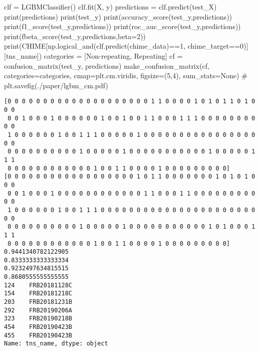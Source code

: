 \documentclass[
  letterpaper,
  DIV=11,
  numbers=noendperiod]{scrartcl}
\newenvironment{Shaded}{\begin{snugshade}}{\end{snugshade}}
\newcommand{\BuiltInTok}[1]{\textcolor[rgb]{0.00,0.23,0.31}{#1}}
\newcommand{\CommentTok}[1]{\textcolor[rgb]{0.37,0.37,0.37}{#1}}
\newcommand{\DecValTok}[1]{\textcolor[rgb]{0.68,0.00,0.00}{#1}}
\newcommand{\NormalTok}[1]{\textcolor[rgb]{0.00,0.23,0.31}{#1}}
\newcommand{\OperatorTok}[1]{\textcolor[rgb]{0.37,0.37,0.37}{#1}}
\newcommand{\StringTok}[1]{\textcolor[rgb]{0.13,0.47,0.30}{#1}}
\newcommand{\VariableTok}[1]{\textcolor[rgb]{0.07,0.07,0.07}{#1}}
\begin{document}
\begin{Shaded}
\begin{Highlighting}[]
\NormalTok{clf }\OperatorTok{=}\NormalTok{ LGBMClassifier()}
\NormalTok{clf.fit(X, y)}
\NormalTok{predictions }\OperatorTok{=}\NormalTok{ clf.predict(test\_X)}
\BuiltInTok{print}\NormalTok{(predictions)}
\BuiltInTok{print}\NormalTok{(test\_y)}
\BuiltInTok{print}\NormalTok{(accuracy\_score(test\_y,predictions))}
\BuiltInTok{print}\NormalTok{(f1\_score(test\_y,predictions))}
\BuiltInTok{print}\NormalTok{(roc\_auc\_score(test\_y,predictions))}
\BuiltInTok{print}\NormalTok{(fbeta\_score(test\_y,predictions,beta}\OperatorTok{=}\DecValTok{2}\NormalTok{))}
\BuiltInTok{print}\NormalTok{(CHIME[np.logical\_and(clf.predict(chime\_data)}\OperatorTok{==}\DecValTok{1}\NormalTok{, chime\_target}\OperatorTok{==}\DecValTok{0}\NormalTok{)][}\StringTok{\textquotesingle{}tns\_name\textquotesingle{}}\NormalTok{])}
\NormalTok{categories }\OperatorTok{=}\NormalTok{ [}\StringTok{\textquotesingle{}Non{-}repeating\textquotesingle{}}\NormalTok{, }\StringTok{\textquotesingle{}Repeating\textquotesingle{}}\NormalTok{]}
\NormalTok{cf }\OperatorTok{=}\NormalTok{ confusion\_matrix(test\_y, predictions)}
\NormalTok{make\_confusion\_matrix(cf, }
\NormalTok{                      categories}\OperatorTok{=}\NormalTok{categories,}
\NormalTok{                      cmap}\OperatorTok{=}\NormalTok{plt.cm.viridis,}
\NormalTok{                      figsize}\OperatorTok{=}\NormalTok{(}\DecValTok{5}\NormalTok{,}\DecValTok{4}\NormalTok{),}
\NormalTok{                      sum\_stats}\OperatorTok{=}\VariableTok{None}\NormalTok{)}
\CommentTok{\# plt.savefig(\textquotesingle{}./paper/lgbm\_cm.pdf\textquotesingle{})}
\end{Highlighting}
\end{Shaded}

\begin{verbatim}
[0 0 0 0 0 0 0 0 0 0 0 0 0 0 0 0 0 0 0 0 1 1 0 0 0 0 1 0 1 0 1 1 0 1 0 0 0
 0 0 1 0 0 0 1 0 0 0 0 0 0 1 0 0 1 0 0 1 1 0 0 0 1 1 1 0 0 0 0 0 0 0 0 0 0
 1 0 0 0 0 0 0 1 0 0 1 1 1 0 0 0 0 0 1 0 0 0 0 0 0 0 0 0 0 0 0 0 0 0 0 0 0
 0 0 0 0 0 0 0 0 0 0 1 0 0 0 0 0 1 0 0 0 0 0 0 0 0 0 0 0 1 0 0 0 0 0 1 1 1
 0 0 0 0 0 0 0 0 0 0 0 0 1 0 0 1 1 0 0 0 0 1 0 0 0 0 0 0 0 0 0]
[0 0 0 0 0 0 0 0 0 0 0 0 0 0 0 0 0 0 1 0 1 1 0 0 0 0 0 0 0 1 0 1 0 1 0 0 0
 0 0 1 0 0 0 1 0 0 0 0 0 0 0 0 0 0 0 0 1 1 0 0 0 1 1 0 0 0 0 0 0 0 0 0 0 0
 1 0 0 0 0 0 0 1 0 0 1 1 1 0 0 0 0 0 0 0 0 0 0 0 0 0 0 0 0 0 0 0 0 0 0 0 0
 0 0 0 0 0 0 0 0 0 0 1 0 0 0 0 0 1 0 0 0 0 0 0 0 0 0 0 0 1 0 1 0 0 0 1 1 1
 0 0 0 0 0 0 0 0 0 0 0 0 1 0 0 1 1 0 0 0 0 1 0 0 0 0 0 0 0 0 0]
0.9441340782122905
0.8333333333333334
0.9232497634815515
0.8680555555555555
124    FRB20181128C
154    FRB20181218C
203    FRB20181231B
292    FRB20190206A
323    FRB20190218B
454    FRB20190423B
455    FRB20190423B
Name: tns_name, dtype: object
\end{verbatim}
\end{document}
